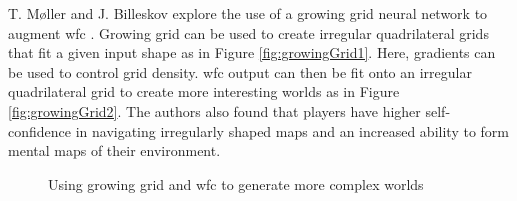 T. Møller and J. Billeskov explore the use of a growing grid neural network to augment \acrshort{wfc} \cite{WFC_Neural_Network}. Growing grid can be used to create irregular quadrilateral grids that fit a given input shape as in Figure \ref{fig:growingGrid1}. Here, gradients can be used to control grid density. \acrshort{wfc} output can then be fit onto an irregular quadrilateral grid to create more interesting worlds as in Figure \ref{fig:growingGrid2}. The authors also found that players have higher self-confidence in navigating irregularly shaped maps and an increased ability to form mental maps of their environment.

\begin{figure}[H]
    \centering
    \hfill
    \caption{Using growing grid and \acrshort{wfc} to generate more complex worlds \cite{WFC_Neural_Network}}
    \label{fig:growingGrid}
\end{figure}


